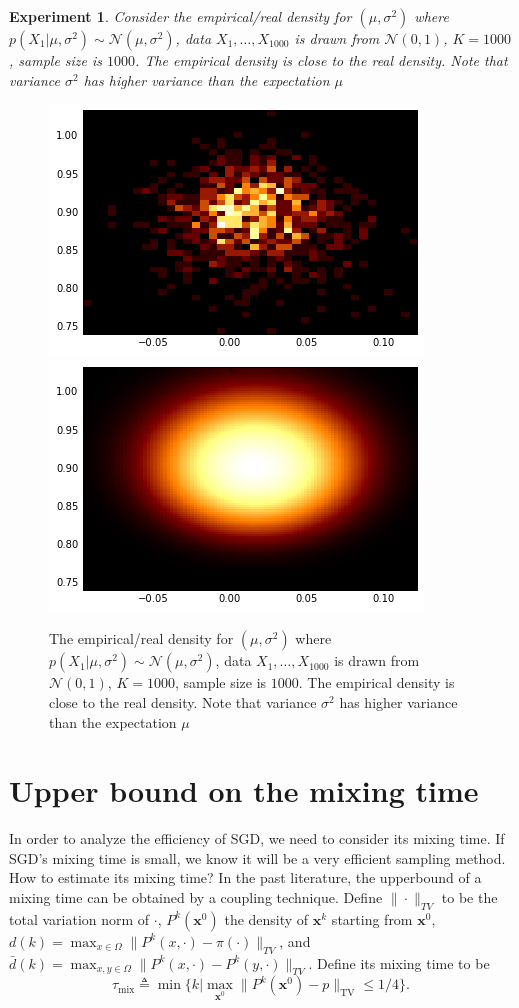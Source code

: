\documentclass[preprint,12pt,3p]{elsarticle}
\newcommand{\bx}{\mathbf{x}}
\newcommand{\N}{\mathscr{N}}
\newtheorem{experiment}{Experiment}
\begin{document}
\begin{experiment}
Consider the empirical/real density for $(\mu, \sigma^2)$ where $p(X_1|\mu, \sigma^2)\sim \N(\mu, \sigma^2)$, data $X_1,\ldots, X_{1000}$ is drawn from $\N(0, 1)$, $K = 1000$, sample size is $1000$. The empirical density is close to the real density. Note that variance $\sigma^2$ has higher variance than the expectation $\mu$
\end{experiment}
\begin{figure}
\includegraphics[width=0.5\linewidth]{../figure/simulation2_empirical.png}
\includegraphics[width=0.5\linewidth]{../figure/simulation2_real.png}
\caption{The empirical/real density for $(\mu, \sigma^2)$ where $p(X_1|\mu, \sigma^2)\sim \N(\mu, \sigma^2)$, data $X_1,\ldots, X_{1000}$ is drawn from $\N(0, 1)$, $K = 1000$, sample size is $1000$. The empirical density is close to the real density. Note that variance $\sigma^2$ has higher variance than the expectation $\mu$}
\end{figure}
\newpage
\section{Upper bound on the mixing time} %
\label{sec:upper_bound_on_the_mixing_time}
In order to analyze the efficiency of SGD, we need to consider its mixing time. If SGD's mixing time is small, we know it will be a very efficient sampling method. How to estimate its mixing time? In the past literature, the upperbound of a mixing time can be obtained by a coupling technique. Define $\|\cdot\|_{TV}$ to be the total variation norm of $\cdot$, $P^k(\bx^0)$ the density of $\bx^k$ starting from $\bx^0$, $d(k) = \max_{x\in \Omega} \|P^k(x, \cdot) - \pi(\cdot)\|_{TV}$, and $\bar{d}(k) = \max_{x,y\in \Omega} \|P^k(x, \cdot) - P^k(y,\cdot)\|_{TV}$.
Define its mixing time to be
\[
\tau_{\mathrm{mix}} \triangleq \min\{k|\max_{\bx^0}\|P^k(\bx^0) - p\|_{\mathrm{TV}}\leq 1/4\}.
\]
\end{document}
